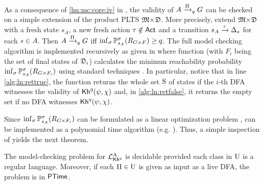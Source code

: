 As a consequence of \cref{lm:mc:core:iv} in , the
validity of $A\reach{\plans}_qG$ can be checked
on a simple extension of the product PLTS
$\model{\times}\dfa$.  More precisely, extend $\model{\times}\dfa$
with a fresh state $s_A$, a new fresh action $\tau\notin\Act$ and a
transition $s_A\reach{\tau}\Dirac_{s}$ for each $s\in A$.  Then
$A\reach{\plans}_qG$ iff
$\inf_{\strat}\Prob^{\strat}_{s_A}(R_{G{\times}F})\geq q$.
%
The full model checking algorithm is implemented recursively as given
in  where function 
(with $F_i$ being the set of final states of $\dfa_i$) calculates the
minimun reachability probability
$\inf_{\strat}\Prob^{\strat}_{s_A}(R_{G{\times}F_i})$ using standard
techniques \cite{Puterman94,BaierK08}.
%
In particular, notice that in line \ref{alg:ln:rettrue}, the function
returns the whole set $\S$ of states if the $i$-th DFA witnesses the
validity of $\kh^q(\psi,\chi)$ and, in \ref{alg:ln:retfalse}, it
returns the empty set if no DFA witnesses $\kh^q(\psi,\chi)$.
%

Since $\inf_{\strat}\Prob^{\strat}_{s_A}(R_{G{\times}F_i})$ can be
formulated as a linear optimization problem
\cite{Puterman94,BA95,BaierK08}, \MinReachProb{} can be implemented as
a polynomial time algorithm (e.g. \cite{Karmarkar84}).  Thus, a simple
inspection of  yields the next theorem.

\begin{theorem}\label{th:PKhadapt:mc}
  The model-checking problem for $\PKhadapt$ is decidable provided
  each class in $\Unc$ is a regular language. Moreover, if each
  $\plans\in\Unc$ is given as input as a live DFA, the problem is in
  $\PTIME$.
\end{theorem}







